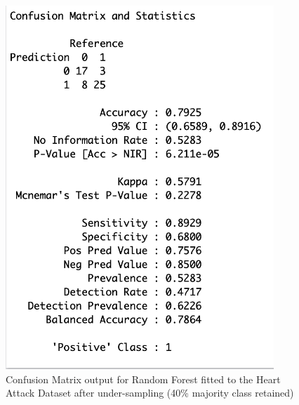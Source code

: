 \begin{figure}[!htbp]
\begin{minipage}{0.45\textwidth}
        \includegraphics[width=0.9\textwidth]{ThesisTemplate/appendix/images/Chapter5Appendix/ConfusionMatrix40/HA.png}
        \caption{Confusion Matrix output for Random Forest fitted to the Heart Attack Dataset after under-sampling (40\% majority class retained)}
        \label{fig:my_label}
    \end{minipage}
\end{figure}


